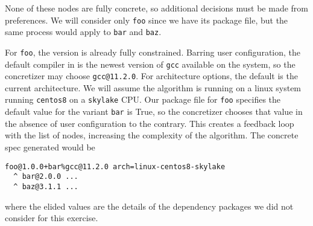 None of these nodes are fully concrete, so additional decisions must be made from preferences.
We will consider only \texttt{foo} since we have its package file, but the same process would apply to \texttt{bar} and \texttt{baz}.

For \texttt{foo}, the version is already fully constrained.
Barring user configuration, the default compiler in \spack is the newest version of \texttt{gcc} available on the system, so the concretizer may choose \texttt{gcc@11.2.0}.
For architecture options, the default is the current architecture. We will assume the algorithm is running on a linux system running \texttt{centos8} on a \texttt{skylake} CPU.
Our package file for \texttt{foo} specifies the default value for the variant \texttt{bar} is True, so the concretizer chooses that value in the absence of user configuration to the contrary.
This creates a feedback loop with the list of nodes, increasing the complexity of the algorithm.
The concrete spec generated would be

\begin{verbatim}
foo@1.0.0+bar%gcc@11.2.0 arch=linux-centos8-skylake
  ^ bar@2.0.0 ...
  ^ baz@3.1.1 ...
\end{verbatim}

where the elided values are the details of the dependency packages we did not consider for this exercise.
